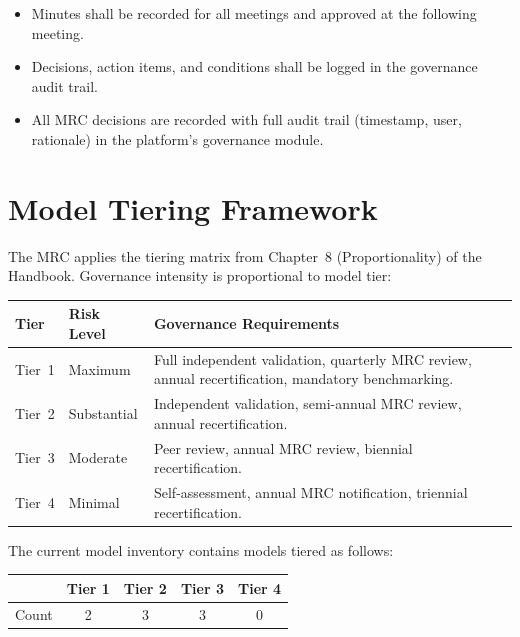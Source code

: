 \documentclass[11pt]{article}
\begin{document}
\begin{itemize}
    \item Minutes shall be recorded for all meetings and approved at the
          following meeting.
    \item Decisions, action items, and conditions shall be logged in the
          governance audit trail.
    \item All MRC decisions are recorded with full audit trail (timestamp, user,
          rationale) in the platform's governance module.
\end{itemize}

\section{Model Tiering Framework}

The MRC applies the tiering matrix from Chapter~8 (Proportionality) of the
Handbook. Governance intensity is proportional to model tier:

\begin{longtable}{p{2cm}p{3cm}p{8.5cm}}
\toprule
\textbf{Tier} & \textbf{Risk Level} & \textbf{Governance Requirements} \\
\midrule
\endhead
Tier~1 & Maximum & Full independent validation, quarterly MRC review,
         annual recertification, mandatory benchmarking. \\[6pt]
Tier~2 & Substantial & Independent validation, semi-annual MRC review,
         annual recertification. \\[6pt]
Tier~3 & Moderate & Peer review, annual MRC review, biennial
         recertification. \\[6pt]
Tier~4 & Minimal & Self-assessment, annual MRC notification, triennial
         recertification. \\
\bottomrule
\end{longtable}

\noindent The current model inventory contains models tiered as follows:

\begin{center}
\begin{tabular}{lcccc}
\toprule
& \textbf{Tier 1} & \textbf{Tier 2} & \textbf{Tier 3} & \textbf{Tier 4} \\
\midrule
Count & 2 & 3 & 3 & 0 \\
\bottomrule
\end{tabular}
\end{center}
\end{document}
